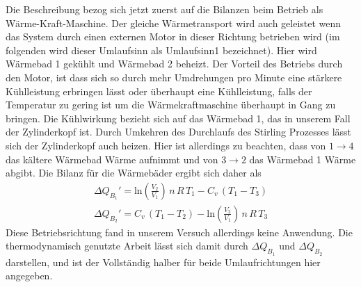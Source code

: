 \documentclass[a4paper, 12pt,]{scrartcl}
\begin{document}
Die Beschreibung bezog sich jetzt zuerst auf die Bilanzen beim Betrieb als Wärme-Kraft-Maschine. Der gleiche Wärmetransport wird auch geleistet wenn das System durch einen externen Motor in dieser Richtung betrieben wird (im folgenden wird dieser Umlaufsinn als Umlaufsinn1 bezeichnet). Hier wird Wärmebad 1 gekühlt und Wärmebad 2 beheizt. Der Vorteil des Betriebs durch den Motor, ist dass sich so durch mehr Umdrehungen pro Minute eine stärkere Kühlleistung erbringen lässt oder überhaupt eine Kühlleistung, falls der Temperatur zu gering ist um die Wärmekraftmaschine überhaupt in Gang zu bringen. Die Kühlwirkung bezieht sich auf das Wärmebad 1, das in unserem Fall der Zylinderkopf ist. \newline
Durch Umkehren des Durchlaufs des Stirling Prozesses lässt sich der Zylinderkopf auch heizen. Hier ist allerdings zu beachten, dass von $1\rightarrow4$ das kältere Wärmebad Wärme aufnimmt und von $3\rightarrow2$ das Wärmebad 1 Wärme abgibt. Die Bilanz für die Wärmebäder ergibt sich daher als
\begin{gather*}\Delta{Q_{B_1}}'=\text{ln}\left(\frac{V_2}{V_1}\right)\,n\,R\,T_1-C_v\,(T_1-T_3)\\
\Delta{Q_{B_2}}'=C_v\,(T_1-T_2)-\text{ln}\left(\frac{V_2}{V_1}\right)\,n\,R\,T_3\end{gather*}
Diese Betriebsrichtung fand in unserem Versuch allerdings keine Anwendung.
Die thermodynamisch genutzte Arbeit lässt sich damit durch $\Delta{Q_{B_1}}$ und $\Delta{Q_{B_2}}$ darstellen, und ist der Vollständig halber für beide Umlaufrichtungen hier angegeben.
\end{document}
